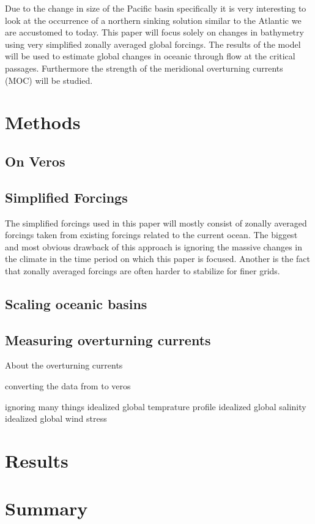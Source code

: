 \documentclass[a4paper]{article}
\begin{document}
\begin{multicols}{2}
Due to the change in size of the Pacific basin specifically it is very interesting to look at the occurrence of a northern sinking solution similar to the Atlantic we are accustomed to today.
This paper will focus solely on changes in bathymetry using very simplified zonally averaged global forcings. The results of the model will be used to estimate global changes in oceanic through flow at the critical passages. Furthermore the strength of the meridional overturning currents (MOC) will be studied.




\section{Methods}
\subsection{On Veros}
\subsection{Simplified Forcings}
The simplified forcings used in this paper will mostly consist of zonally averaged forcings taken from existing forcings related to the current ocean. The biggest and most obvious drawback of this approach is ignoring the massive changes in the climate in the time period on which this paper is focused. Another is the fact that zonally averaged forcings are often harder to stabilize for finer grids. 


\subsection{Scaling oceanic basins}
\subsection{Measuring overturning currents}
About the overturning currents

converting the data from \cite{Muller2008Mar} to veros

ignoring many things
idealized global temprature profile
idealized global salinity
idealized global wind stress


\section{Results}

\section{Summary}

\printbibliography

\end{multicols}
\end{document}

